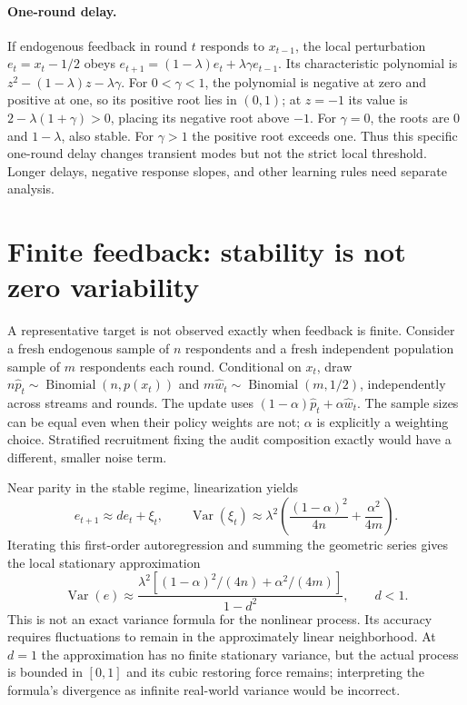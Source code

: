 \documentclass{article}
\begin{document}
\paragraph{One-round delay.}
If endogenous feedback in round $t$ responds to $x_{t-1}$, the local perturbation $e_t=x_t-1/2$ obeys $e_{t+1}=(1-\lambda)e_t+\lambda\gamma e_{t-1}$. Its characteristic polynomial is $z^2-(1-\lambda)z-\lambda\gamma$. For $0<\gamma<1$, the polynomial is negative at zero and positive at one, so its positive root lies in $(0,1)$; at $z=-1$ its value is $2-\lambda(1+\gamma)>0$, placing its negative root above $-1$. For $\gamma=0$, the roots are $0$ and $1-\lambda$, also stable. For $\gamma>1$ the positive root exceeds one. Thus this specific one-round delay changes transient modes but not the strict local threshold. Longer delays, negative response slopes, and other learning rules need separate analysis.

\section{Finite feedback: stability is not zero variability}\label{sec:noise}
A representative target is not observed exactly when feedback is finite. Consider a fresh endogenous sample of $n$ respondents and a fresh independent population sample of $m$ respondents each round. Conditional on $x_t$, draw $n\widehat p_t\sim\operatorname{Binomial}(n,p(x_t))$ and $m\widehat w_t\sim\operatorname{Binomial}(m,1/2)$, independently across streams and rounds. The update uses $(1-\alpha)\widehat p_t+\alpha\widehat w_t$. The sample sizes can be equal even when their policy weights are not; $\alpha$ is explicitly a weighting choice. Stratified recruitment fixing the audit composition exactly would have a different, smaller noise term.

Near parity in the stable regime, linearization yields
\begin{equation}
e_{t+1}\approx d e_t+\xi_t,\qquad
\operatorname{Var}(\xi_t)\approx\lambda^2\left(\frac{(1-\alpha)^2}{4n}+\frac{\alpha^2}{4m}\right).
\label{eq:innovation}
\end{equation}
Iterating this first-order autoregression and summing the geometric series gives the local stationary approximation
\begin{equation}
\operatorname{Var}(e)\approx
\frac{\lambda^2[(1-\alpha)^2/(4n)+\alpha^2/(4m)]}{1-d^2},\qquad d<1.
\label{eq:variance}
\end{equation}
This is not an exact variance formula for the nonlinear process. Its accuracy requires fluctuations to remain in the approximately linear neighborhood. At $d=1$ the approximation has no finite stationary variance, but the actual process is bounded in $[0,1]$ and its cubic restoring force remains; interpreting the formula's divergence as infinite real-world variance would be incorrect.
\end{document}
